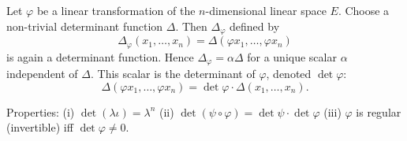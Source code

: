 Let $\varphi$ be a linear transformation of the $n$-dimensional linear space $E$. Choose a non-trivial determinant function $\Delta$. Then $\Delta_\varphi$ defined by
$$\Delta_\varphi(x_1, \ldots, x_n) = \Delta(\varphi x_1, \ldots, \varphi x_n)$$
is again a determinant function. Hence $\Delta_\varphi = \alpha \Delta$ for a unique scalar $\alpha$ independent of $\Delta$. This scalar is the determinant of $\varphi$, denoted $\det \varphi$:
$$\Delta(\varphi x_1, \ldots, \varphi x_n) = \det \varphi \cdot \Delta(x_1, \ldots, x_n).$$

Properties:
(i) $\det(\lambda\iota) = \lambda^n$
(ii) $\det(\psi \circ \varphi) = \det \psi \cdot \det \varphi$
(iii) $\varphi$ is regular (invertible) iff $\det \varphi \neq 0$.
